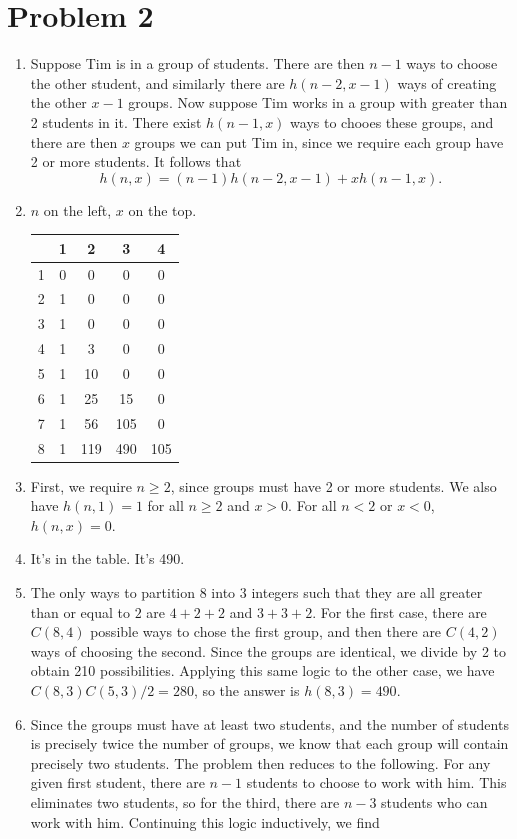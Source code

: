 \documentclass[11pt, letterpaper]{report}
\begin{document}
\section*{Problem 2}
\begin{enumerate}
	\item Suppose Tim is in a group of students. There are then $n-1$ ways to choose the other student, and similarly there are $h(n-2,x-1)$ ways of creating the other $x-1$ groups. Now suppose Tim works in a group with greater than 2 students in it. There exist $h(n-1,x)$ ways to chooes these groups, and there are then $x$ groups we can put Tim in, since we require each group have 2 or more students. It follows that
		\[
			h(n,x)=(n-1)h(n-2,x-1)+xh(n-1,x)
		.\]
	\item $n$ on the left, $x$ on the top.
		\begin{center}
		\begin{tabular}{c|cccc}
			&1&2&3&4\\
			\hline
			1&0&0&0&0\\
			2&1&0&0&0\\
			3&1&0&0&0\\
			4&1&3&0&0\\
			5&1&10&0&0\\
			6&1&25&15&0\\
			7&1&56&105&0\\
			8&1&119&490&105\\
		\end{tabular}
		\end{center}
	\item First, we require $n \geq 2$, since groups must have 2 or more students. We also have $h(n,1)=1$ for all $n\geq 2$ and $x>0$. For all $n<2$ or $x<0$, $h(n,x)=0$.
	\item It's in the table. It's 490.
	\item The only ways to partition $8$ into $3$ integers such that they are all greater than or equal to $2$ are $4+2+2$ and $3+3+2$. For the first case, there are $C(8,4)$ possible ways to chose the first group, and then there are $C(4,2)$ ways of choosing the second. Since the groups are identical, we divide by 2 to obtain 210 possibilities. Applying this same logic to the other case, we have $C(8,3)C(5,3) /2=280$, so the answer is $h(8,3)=490$.
	\item Since the groups must have at least two students, and the number of students is precisely twice the number of groups, we know that each group will contain precisely two students. The problem then reduces to the following. For any given first student, there are $n-1$ students to choose to work with him. This eliminates two students, so for the third, there are $n-3$ students who can work with him. Continuing this logic inductively, we find

\end{enumerate}
\end{document}
